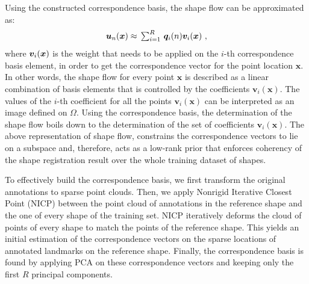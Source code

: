 Using the constructed correspondence basis, the shape flow can be approximated as:
\vspace{-5pt}
\begin{equation}\label{eq:LinTrajModel}
    \bm{u}_n(\bx) \approx
    \textstyle \, \sum_{i=1}^R \, \bm{q}_i(n)\bm{v}_i(\bx) \,\, ,
\vspace{-5pt}
\end{equation}
where $\bm{v}_i(\boldsymbol{x})$ is the weight that needs to be applied on the $i$-th correspondence basis element, in order to get the correspondence vector for the point location $\bm{x}$. In other words, the shape flow for every point $\bm{x}$ is described as a linear combination of basis elements that is controlled by the coefficients $\bm{v}_i(\bm{x})$.
The values of the $i$-th coefficient for all the points $\bm{v}_i(\bm{x})$ can be interpreted as an image defined on $\Omega$. Using the correspondence basis, the determination of the shape flow boils down to the determination of the set of coefficients $\bm{v}_i(\bm{x})$. The above representation of shape flow, constrains the correspondence vectors to lie on a subspace and, therefore, acts as a low-rank prior that enforces coherency of the shape registration result over the whole training dataset of shapes.


To effectively build the correspondence basis, we first transform the original annotations to sparse point clouds. Then, we apply Nonrigid Iterative Closest Point (NICP) \cite{Amber2007} between the point cloud of annotations in the reference shape and the one of every shape of the training set. NICP iteratively deforms the cloud of points of every shape to match the points of the reference shape. This yields an initial estimation of the correspondence vectors on the sparse locations of annotated landmarks on the reference shape. Finally, the correspondence basis is found by applying PCA on these correspondence vectors and keeping only the first $R$ principal components.



